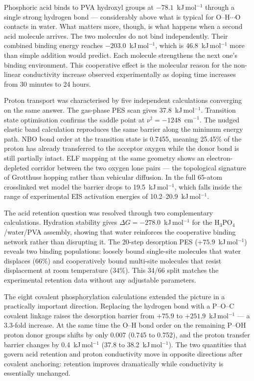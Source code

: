\documentclass[12pt,a4paper]{report}
\begin{document}
Phosphoric acid binds to PVA hydroxyl groups at 
$-78.1$~kJ\,mol\(^{-1}\) through a single strong hydrogen 
bond — considerably above what is typical for 
O--H$\cdots$O contacts in water. What matters more, though, 
is what happens when a second acid molecule arrives. The 
two molecules do not bind independently. Their combined 
binding energy reaches $-203.0$~kJ\,mol\(^{-1}\), which is 
46.8~kJ\,mol\(^{-1}\) more than simple addition would 
predict. Each molecule strengthens the next one's binding 
environment. This cooperative effect is the molecular 
reason for the non-linear conductivity increase observed 
experimentally as doping time increases from 30 minutes to 
24 hours.

Proton transport was characterised by five independent 
calculations converging on the same answer. The gas-phase 
PES scan gives 37.8~kJ\,mol\(^{-1}\). Transition state 
optimisation confirms the saddle point at 
$\nu^{\ddagger} = -1248$~cm\(^{-1}\). The nudged elastic 
band calculation reproduces the same barrier along the 
minimum energy path. NBO bond order at the transition 
state is 0.7455, meaning 25.45\% of the proton has already 
transferred to the acceptor oxygen while the donor bond 
is still partially intact. ELF mapping at the same geometry 
shows an electron-depleted corridor between the two oxygen 
lone pairs — the topological signature of Grotthuss 
hopping rather than vehicular diffusion. In the full 
65-atom crosslinked wet model the barrier drops to 
19.5~kJ\,mol\(^{-1}\), which falls inside the range of 
experimental EIS activation energies of 
10.2--20.9~kJ\,mol\(^{-1}\).

The acid retention question was resolved through two 
complementary calculations. Hydration stability gives 
$\Delta G = -278.0$~kJ\,mol\(^{-1}\) for the 
H\(_3\)PO\(_4\)/water/PVA assembly, showing that water 
reinforces the cooperative binding network rather than 
disrupting it. The 20-step desorption PES 
($+75.9$~kJ\,mol\(^{-1}\)) reveals two binding populations: 
loosely bound single-site molecules that water displaces 
(66\%) and cooperatively bound multi-site molecules that 
resist displacement at room temperature (34\%). This 
34/66 split matches the experimental retention data 
without any adjustable parameters.

The eight covalent phosphorylation calculations extended 
the picture in a practically important direction. Replacing 
the hydrogen bond with a P--O--C covalent linkage raises 
the desorption barrier from $+75.9$ to 
$+251.9$~kJ\,mol\(^{-1}\) — a 3.3-fold increase. At the 
same time the O--H bond order on the remaining P--OH proton 
donor groups shifts by only 0.007 (0.745 to 0.752), and 
the proton transfer barrier changes by 0.4~kJ\,mol\(^{-1}\) 
(37.8 to 38.2~kJ\,mol\(^{-1}\)). The two quantities that 
govern acid retention and proton conductivity move in 
opposite directions after covalent anchoring: retention 
improves dramatically while conductivity is essentially 
unchanged.
\end{document}
